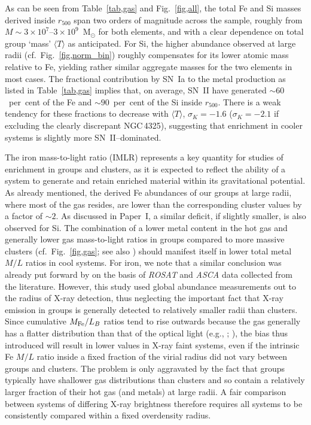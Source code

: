 \documentclass[useAMS,usenatbib]{mn2e}
\begin{document}
As can be seen from Table~\ref{tab,gas} and Fig.~\ref{fig,all}, the
total Fe and Si masses derived inside $r_{500}$ span two orders of
magnitude across the sample, roughly from $M \sim 3\times
10^7$--$3\times 10^9$~M$_\odot$ for both elements, and with a clear
dependence on total group `mass' $\langle T \rangle$ as anticipated.
For Si, the higher abundance observed at large radii (cf.\
Fig.~\ref{fig,norm_bin}) roughly compensates for its lower atomic mass
relative to Fe, yielding rather similar aggregate masses for the two
elements in most cases.  The fractional contribution by SN~Ia to the
metal production as listed in Table~\ref{tab,gas} implies that, on
average, SN~II have generated $\sim 60$~per~cent of the Fe and $\sim
90$~per~cent of the Si inside $r_{500}$. There is a weak tendency for
these fractions to decrease with $\langle T\rangle$, $\sigma_K = -1.6$
($\sigma_K=-2.1$ if excluding the clearly discrepant NGC\,4325),
suggesting that enrichment in cooler systems is slightly more
SN~II--dominated.

The iron mass-to-light ratio (IMLR) represents a key quantity for
studies of enrichment in groups and clusters, as it is expected to
reflect the ability of a system to generate and retain enriched
material within its gravitational potential.  As already mentioned,
the derived Fe abundances of our groups at large radii, where most of
the gas resides, are lower than the corresponding cluster values by a
factor of $\sim 2$.  As discussed in Paper~I, a similar deficit, if
slightly smaller, is also observed for Si.  The combination of a lower
metal content in the hot gas and generally lower gas mass-to-light
ratios in groups compared to more massive clusters (cf.\
Fig.~\ref{fig,gas}; see also \citealt*{lin03}) should manifest itself
in lower total metal $M/L$ ratios in cool systems.  For iron, we note
that a similar conclusion was already put forward by \citet{renz97} on
the basis of {\em ROSAT} and {\em ASCA} data collected from the
literature.  However, this study used global abundance measurements
out to the radius of X-ray detection, thus neglecting the important
fact that X-ray emission in groups is generally detected to relatively
smaller radii than clusters. Since cumulative $M_{\rm Fe}/L_B$ ratios
tend to rise outwards because the gas generally has a flatter
distribution than that of the optical light (e.g., \citealt{fino00};
\citealt{sato09}), the bias thus introduced will result in lower
values in X-ray faint systems, even if the intrinsic Fe $M/L$ ratio
inside a fixed fraction of the virial radius did not vary between
groups and clusters. The problem is only aggravated by the fact that
groups typically have shallower gas distributions than clusters and so
contain a relatively larger fraction of their hot gas (and metals) at
large radii. A fair comparison between systems of differing X-ray
brightness therefore requires all systems to be consistently compared
within a fixed overdensity radius.
\end{document}
